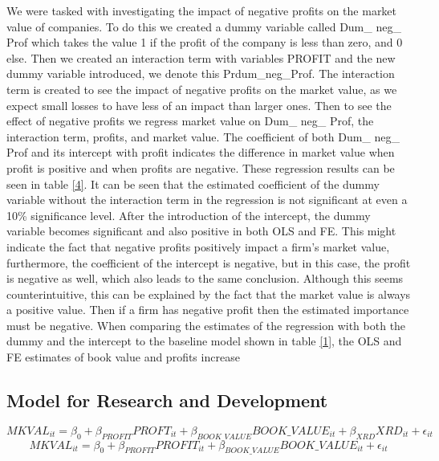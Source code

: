 \documentclass[11pt, letterpaper]{article}
\begin{document}
We were tasked with investigating the impact of negative profits on the market value of companies. To do this we created a dummy variable called Dum\_ neg\_ Prof which takes the value 1 if the profit of the company is less than zero, and 0 else. Then we created an interaction term with variables PROFIT and the new dummy variable introduced, we denote this Prdum\_neg\_Prof. The interaction term is created to see the impact of negative profits on the market value, as we expect small losses to have less of an impact than larger ones. Then to see the effect of negative profits we regress market value on Dum\_ neg\_ Prof, the interaction term, profits, and market value. The coefficient of both Dum\_ neg\_ Prof and its intercept with profit indicates the difference in market value when profit is positive and when profits are negative. These regression results can be seen in table \ref{4}. It can be seen that the estimated coefficient of the dummy variable without the interaction term in the regression is not significant at even a 10\% significance level. After the introduction of the intercept, the dummy variable becomes significant and also positive in both OLS and  FE. This might indicate the fact that negative profits positively impact a firm's market value, furthermore, the coefficient of the intercept is negative, but in this case, the profit is negative as well, which also leads to the same conclusion. Although this seems counterintuitive, this can be explained by the fact that the market value is always a positive value. Then if a firm has negative profit then the estimated importance must be negative. When comparing the estimates of the regression with both the dummy and the intercept to the baseline model shown in table \ref{1}, the OLS and FE estimates of book value and profits increase 


\subsection{Model for Research and Development }
\[MKVAL_{it}=\beta_{0}+\beta_{PROFIT}PROFT_{it}+\beta_{BOOK\_VALUE}BOOK\_VALUE_{it}+\beta_{XRD}XRD_{it}+\epsilon_{it}\]
\[MKVAL_{it}=\beta_{0}+\beta_{PROFIT}PROFIT_{it}+\beta_{BOOK\_VALUE}BOOK\_VALUE_{it}+\epsilon_{it}\]
\end{document}
